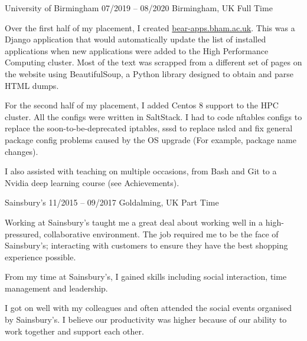 \documentclass[11pt]{article} %
\begin{document}
\begin{paracol}{2}


{University of Birmingham} %
{07/2019 -- 08/2020} %
{Birmingham, UK} %
{Full Time} %
{Over the first half of my placement, I created \href{https://bear-apps.bham.ac.uk}{bear-apps.bham.ac.uk}.
This was a Django application that would automatically update the list of installed applications
when new applications were added to the High Performance Computing cluster.
Most of the text was scrapped from a different set of pages on the website using BeautifulSoup, a Python library designed
to obtain and parse HTML dumps.


For the second half of my placement, I added Centos 8 support to the HPC cluster.
All the configs were written in SaltStack. 
I had to code nftables configs to replace the soon-to-be-deprecated iptables, sssd to replace nslcd
and fix general package config problems caused by the OS upgrade (For example, package name changes).

I also assisted with teaching on multiple occasions, from Bash and Git to a Nvidia deep learning course (see Achievements).
} %
{Sainsbury's} %
{11/2015 -- 09/2017} %
{Goldalming, UK} %
{Part Time} %
{Working at Sainsbury's taught me a great deal about working well in a high-pressured,
collaborative environment.
The job required me to be the face of Sainsbury's; interacting with customers to ensure
they have the best shopping experience possible.

From my time at Sainsbury's, I gained skills including social interaction, time management and leadership.

I got on well with my colleagues and often attended the social events organised by Sainsbury's. I believe our productivity was higher because of our ability to work together and support each other.
}  %


\vspace{-\baselineskip}\medskip %


\end{paracol}
\end{document}
